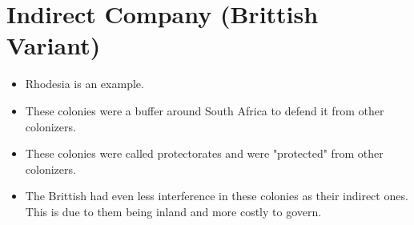 \documentclass{article}
\begin{document}
\section{Indirect Company (Brittish Variant)}
	\begin{itemize}
		\item Rhodesia is an example.
		\item These colonies were a buffer around South Africa to defend it from other colonizers.
		\item These colonies were called protectorates and were "protected" from other colonizers.
		\item The Brittish had even less interference in these colonies as their indirect ones. This is due to them being inland and more costly to govern.
	\end{itemize}
\end{document}
